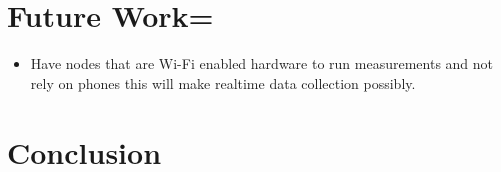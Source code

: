 \section{Future Work=}
\begin{itemize}
    \item Have nodes that are Wi-Fi enabled hardware to run measurements and not rely on phones this will make realtime data collection possibly.
\end{itemize}
\section{Conclusion}\label  {sec:conclusion}
